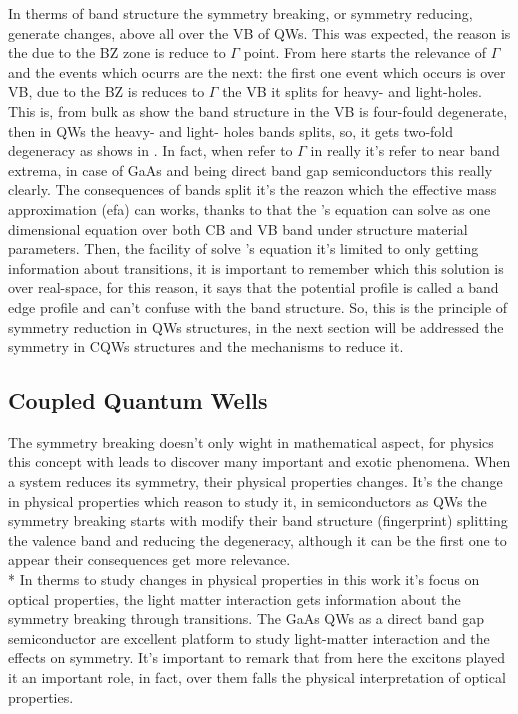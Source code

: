In therms of band structure the symmetry breaking, or symmetry reducing, generate changes, above all over the VB of QWs. This was expected, the reason is the due to the \gls{BZ} zone is reduce to $\Gamma$ point. From here starts the relevance of $\Gamma$ and the events which ocurrs are the next: the first one event which occurs is over VB, due to the \gls{BZ} is reduces to  $\Gamma$ the \gls{VB} it splits for heavy- and light-holes. This is, from bulk as show the band structure in  the \gls{VB} is four-fould degenerate, then in QWs the heavy- and light- holes bands splits, so,  it gets two-fold degeneracy as shows in . In fact, when refer to $\Gamma$ in really it's refer to near band extrema, in case of GaAs and \algaas  being direct band gap semiconductors this really clearly. The consequences of bands split it's the reazon which the effective mass approximation (\gls{efa}) can works, thanks to that the  \sch's equation can solve as one dimensional equation over both \gls{CB} and \gls{VB} band  under structure material parameters. 
Then, the facility of solve \sch's equation it's limited to only getting information about transitions, it is important to remember which this solution is over real-space, for this reason, it says that the potential profile is called a band edge profile and can't confuse with the band structure. So, this is the principle of symmetry reduction in QWs structures, in the next section will be addressed the symmetry in CQWs structures and the mechanisms to reduce it. 


	


\subsection{Coupled Quantum Wells}
\label{subsubsec:chapter-2-coupled-quantum-wells}
\vspace{-10mm}
The symmetry breaking doesn't only wight in mathematical aspect, for physics this concept with leads to discover many important and exotic phenomena. When a system reduces its symmetry, their physical properties changes. It's the change in physical properties which reason to study it, in semiconductors as QWs the symmetry breaking starts with modify their band structure (fingerprint) splitting the valence band and reducing the degeneracy, although it  can be the first one to appear  their consequences get more relevance. \\*
In therms to study changes in physical properties in this work it's focus on optical properties, the light matter interaction gets information about the symmetry breaking through transitions.  The GaAs QWs as a direct band gap semiconductor are excellent platform to study light-matter interaction and the effects on symmetry. It's important to remark  that from here the excitons  played it  an important role, in fact, over them falls  the physical interpretation of optical properties.  

